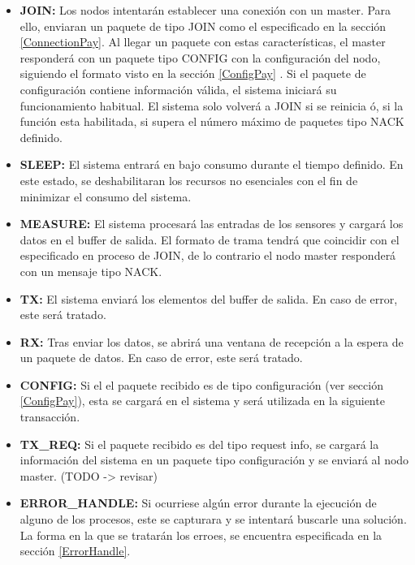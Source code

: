 	\begin{itemize}
		\item \textbf{JOIN:} Los nodos intentarán establecer una conexión con un master. Para ello, enviaran un paquete de tipo JOIN como el especificado en la sección \ref{ConnectionPay}. Al llegar un paquete con estas características, el master responderá con un paquete tipo CONFIG con la configuración del nodo, siguiendo el formato visto en la sección \ref{ConfigPay} . Si el paquete de configuración contiene información válida, el sistema iniciará su funcionamiento habitual. El sistema solo volverá a JOIN si se reinicia ó, si la función esta habilitada, si supera el número máximo de paquetes tipo NACK definido.
		
		\item \textbf{SLEEP: } El sistema entrará en bajo consumo durante el tiempo definido. En este estado, se deshabilitaran los recursos no esenciales con el fin de minimizar el consumo del sistema.
		
		\item \textbf{MEASURE: } El sistema procesará las entradas de los sensores y cargará los datos en el buffer de salida. El formato de trama tendrá que coincidir con el especificado en proceso de JOIN, de lo contrario el nodo master responderá con un mensaje tipo NACK.
		
		\item \textbf{TX: } El sistema enviará los elementos del buffer de salida. En caso de error, este será tratado.
		
		\item \textbf{RX: } Tras enviar los datos, se abrirá una ventana de recepción a la espera de un paquete de datos. En caso de error, este será tratado.
		
		\item \textbf{CONFIG: } Si el el paquete recibido es de tipo configuración (ver sección \ref{ConfigPay}), esta se cargará en el sistema y será utilizada en la siguiente transacción.
		
		\item \textbf{TX\_REQ: } Si el paquete recibido es del tipo request info, se cargará la información del sistema en un paquete tipo configuración y se enviará al nodo master. (TODO -> revisar)
		
		\item \textbf{ERROR\_HANDLE: } Si ocurriese algún error durante la ejecución de alguno de los procesos, este se capturara y se intentará buscarle
una solución. La forma en la que se tratarán los erroes, se encuentra especificada en la sección \ref{ErrorHandle}.
		
		
	\end{itemize}
	
